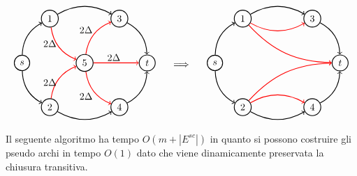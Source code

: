 \[\begin{tabular}{ccc}
    \begin{tikzpicture}[node distance={18mm}, thick , main/.style = {draw, circle}] 
    
    \node[main] (0) {$s$};
    \node[main] (1) at (1, 1.6) {1};
    \node[main] (2) at (1, -1.6) {2};
    \node[main] (3) at (3.5, 1.6) {3};
    \node[main] (4) at (3.5, -1.6) {4};
    \node[main] (6) at (2.25,0) {5};
    \node[main] (5) at (4.5, 0) {$t$};

    \draw[->] (0)[bend left] to (1);
    \draw[->] (0)[bend right] to (2);
    \draw[->] (1)[bend left] to (3);
    \draw[->] (2)[bend right] to (4);
    \draw[->] (4)[bend right] to (5);
    \draw[->] (3)[bend left] to (5);

    \draw[->] (1)[red, bend right] to (6);
    \draw[->] (6)[red, bend right] to (4);
    \draw[->] (6)[red, bend left] to (3);
    \draw[->] (2)[red, bend left] to (6);
    \draw[->] (6) [red] to (5);

    \node at (3.3,0.2) {$2\Delta$};
    \node at (2.3,1.2) {$2\Delta$};
    \node at (2.3,-1.2) {$2\Delta$};

    \node at (1,.7) {$2\Delta$};
    \node at (1,-.7) {$2\Delta$};
    

\end{tikzpicture}&\begin{tikzpicture}
    \node {$\implies$};%
    \node at (0,1.4) {};
    \node at (0,-1.95) {};
\end{tikzpicture}  &
\begin{tikzpicture}[node distance={19mm}, thick , main/.style = {draw, circle}] 
    \node[main] (0) {$s$};
    \node[main] (1) at (1, 1.6) {1};
    \node[main] (2) at (1, -1.6) {2};
    \node[main] (3) at (3.5, 1.6) {3};
    \node[main] (4) at (3.5, -1.6) {4};
    \node[main] (5) at (4.5, 0) {$t$};

    \draw[->] (0)[bend left] to (1);
    \draw[->] (0)[bend right] to (2);
    \draw[->] (1)[bend left] to (3);
    \draw[->] (2)[bend right] to (4);
    \draw[->] (4)[bend right] to (5);
    \draw[->] (3)[bend left] to (5);

    \draw[->] (1)[red, bend right] to (3);
    \draw[->] (2)[red, bend left] to (4);
    \draw[->] (2)[red, bend left = 23] to (5);
    \draw[->] (1)[red, bend right = 23] to (5);


\end{tikzpicture}
\end{tabular}\]
 Il seguente algoritmo ha tempo $O(m + |E^{sc}|)$ in quanto si possono costruire gli pseudo archi in tempo $O(1)$ dato che viene dinamicamente preservata la chiusura transitiva. 

